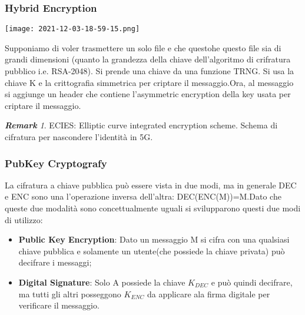 \documentclass{article}
\theoremstyle{remark}
\newtheorem*{remark}{\textbf{Remark}}
\begin{document}
\subsubsection{Hybrid Encryption}
\begin{center}
	\texttt{[image: 2021-12-03-18-59-15.png]}
\end{center}
Supponiamo di voler trasmettere un solo file e che questohe questo file sia di grandi dimensioni (quanto la grandezza della chiave dell'algoritmo di crifratura pubblico i.e. RSA-2048). Si prende una chiave da una funzione TRNG. Si usa la chiave K e la crittografia simmetrica per criptare il messaggio.\newline Ora, al messaggio si aggiunge un header che contiene l'asymmetric encryption della key usata per criptare il messaggio.
\begin{remark}
	ECIES: Elliptic curve integrated encryption scheme. Schema di cifratura per nascondere l'identità in 5G.
\end{remark}
\subsubsection{PubKey Cryptografy}
La cifratura a chiave pubblica può essere vista in due modi, ma in generale DEC e ENC sono una l'operazione inversa dell'altra: DEC(ENC(M))=M.\newline Dato che queste due modalità sono concettualmente uguali si svilupparono questi due modi di utilizzo:\begin{itemize}
	\item \textbf{Public Key Encryption}: Dato un messaggio M si cifra con una qualsiasi chiave pubblica e solamente un utente(che possiede la chiave privata) può decifrare i messaggi;
	\item \textbf{Digital Signature}: Solo A possiede la chiave \(K_{DEC}\) e può quindi decifrare, ma tutti gli altri posseggono \(K_{ENC}\) da applicare ala firma digitale per verificare il messaggio.
\end{itemize}
\end{document}
